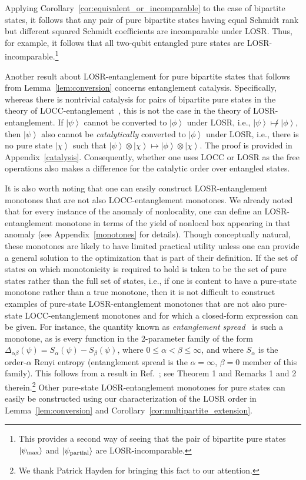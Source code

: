 \documentclass[prx,11pt,letterpaper,twocolumn,accepted=2023-11-27]{quantumarticle}
\newcommand{\ket}[1]{\left| #1 \right>}
\theoremstyle{plain}
\theoremstyle{definition}
\begin{document}
Applying Corollary~\ref{cor:equivalent_or_incomparable} to the case of bipartite states, it follows that any pair of pure bipartite states having equal Schmidt rank but different squared Schmidt coefficients are incomparable under LOSR.  Thus, for example, it follows that all two-qubit entangled pure states are LOSR-incomparable.\footnote{This provides a second way of seeing that the pair of bipartite pure states $|\psi_{\rm max}\rangle$ and $|\psi_{\rm partial}\rangle$ are LOSR-incomparable.}

Another result about LOSR-entanglement for pure bipartite states that follows from Lemma~\ref{lem:conversion}
concerns entanglement catalysis.  Specifically, whereas there is nontrivial catalysis for pairs of bipartite pure states in the theory of LOCC-entanglement~\cite{JonathanPlenio}, this is not the case in the theory of LOSR-entanglement. If $\ket \psi$ cannot be converted to $\ket \phi$ under LOSR, i.e., $\ket{\psi} \not\mapsto \ket{\phi}$, then $\ket \psi$ also cannot be {\em catalytically} converted to $\ket \phi$ under LOSR, i.e., there is no pure state $\ket \chi$ such that $\ket{\psi} \otimes \ket{\chi} \mapsto \ket{\phi} \otimes \ket{\chi}$.  The proof is provided in Appendix~\ref{catalysis}. Consequently, whether one uses LOCC or LOSR as the free operations also makes a difference for the catalytic order over entangled states. 


It is also worth noting that one can easily construct LOSR-entanglement monotones that are not also LOCC-entanglement monotones.  We already noted that for every instance of the anomaly of nonlocality, one can define an LOSR-entanglement monotone in terms of the yield of nonlocal box appearing in that anomaly (see Appendix~\ref{monotones} for details). Though conceptually natural, these monotones are likely to have limited practical utility unless one can provide a general solution to the optimization that is part of their definition.  If the set of states on which monotonicity is required to hold is taken to be the set of pure states rather than the full set of states,  i.e., if one is content to have a pure-state monotone rather than a true monotone, then it is not difficult to construct examples of pure-state LOSR-entanglement monotones that are not also pure-state LOCC-entanglement monotones and for which a closed-form expression can be given. For instance, the quantity known as {\em entanglement spread}~\cite{Harrow2010} is such a monotone, as is every function in the 2-parameter family of the form $\Delta_{\alpha \beta}(\psi) = S_{\alpha}(\psi) - S_{\beta}(\psi)$, where $0\le \alpha < \beta\le \infty$,
 and where $S_{\alpha}$ is the order-$\alpha$ Renyi entropy (entanglement spread is the $\alpha=\infty$, $\beta=0$ member of this family). This follows from a result in Ref.~\cite{Hayden2003}; see Theorem 1 and Remarks 1 and 2 therein.\footnote{We thank Patrick Hayden for bringing this fact to our attention.}  Other pure-state LOSR-entanglement monotones for pure states can easily be constructed using our characterization of the LOSR order in Lemma~\ref{lem:conversion} and Corollary~\ref{cor:multipartite_extension}. 
\end{document}
